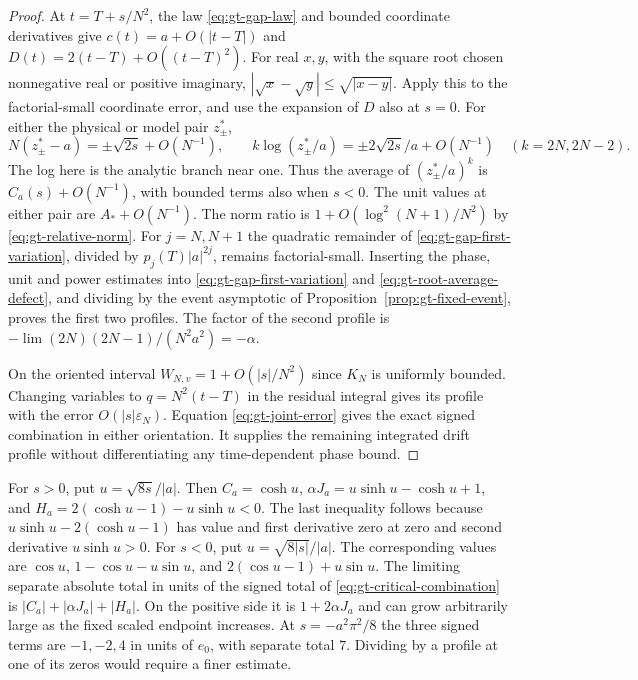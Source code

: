 \begin{proof}
At \(t=T+s/N^2\), the law \eqref{eq:gt-gap-law} and bounded
coordinate derivatives give \(c(t)=a+O(|t-T|)\) and
\(D(t)=2(t-T)+O((t-T)^2)\). For real \(x,y\), with the square
root chosen nonnegative real or positive imaginary,
\(|\sqrt x-\sqrt y|\le\sqrt{|x-y|}\). Apply this to the
factorial-small coordinate error, and use the expansion of \(D\)
also at \(s=0\). For either the physical or model pair \(z_\pm^*\),
\[
 N(z_\pm^*-a)=\pm\sqrt{2s}+O(N^{-1}),\qquad
 k\log(z_\pm^*/a)=\pm 2\sqrt{2s}/a+O(N^{-1})
 \quad(k=2N,2N-2).
\]
The log here is the analytic branch near one. Thus the average of
\((z_\pm^*/a)^k\) is \(C_a(s)+O(N^{-1})\), with bounded terms
also when \(s<0\). The unit values at either pair are
\(A_*+O(N^{-1})\). The norm ratio is
\(1+O(\log^2(N+1)/N^2)\) by \eqref{eq:gt-relative-norm}.
For \(j=N,N+1\) the quadratic remainder of
\eqref{eq:gt-gap-first-variation}, divided by
\(p_j(T)|a|^{2j}\), remains factorial-small. Inserting the phase,
unit and power estimates into \eqref{eq:gt-gap-first-variation}
and \eqref{eq:gt-root-average-defect}, and dividing by the
event asymptotic of Proposition~\ref{prop:gt-fixed-event}, proves
the first two profiles. The factor of the second profile is
\(-\lim (2N)(2N-1)/(N^2a^2)=-\alpha\).

On the oriented interval \(W_{N,v}=1+O(|s|/N^2)\)
since \(K_N\) is uniformly bounded. Changing variables to
\(q=N^2(t-T)\) in the residual integral gives its profile with
the error \(O(|s|\varepsilon_N)\). Equation
\eqref{eq:gt-joint-error} gives the exact signed combination in
either orientation. It supplies the remaining integrated drift
profile without differentiating any time-dependent phase bound.
\end{proof}

For \(s>0\), put \(u=\sqrt{8s}/|a|\). Then
\(C_a=\cosh u\), \(\alpha J_a=u\sinh u-\cosh u+1\), and
\(H_a=2(\cosh u-1)-u\sinh u<0\). The last inequality follows
because \(u\sinh u-2(\cosh u-1)\) has value and first derivative
zero at zero and second derivative \(u\sinh u>0\).
For \(s<0\), put \(u=\sqrt{8|s|}/|a|\). The corresponding
values are \(\cos u\), \(1-\cos u-u\sin u\), and
\(2(\cos u-1)+u\sin u\). The limiting separate absolute total in
units of the signed total of \eqref{eq:gt-critical-combination} is
\(|C_a|+|\alpha J_a|+|H_a|\). On the positive side it is
\(1+2\alpha J_a\) and can grow arbitrarily large as the fixed
scaled endpoint increases. At \(s=-a^2\pi^2/8\) the three signed
terms are \(-1,-2,4\) in units of \(e_0\), with separate total
\(7\). Dividing by a profile at one of its zeros would require a
finer estimate.

